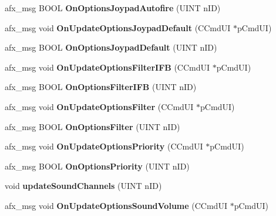 \begin{DoxyCompactItemize}
afx\+\_\+msg B\+O\+OL {\bfseries On\+Options\+Joypad\+Autofire} (U\+I\+NT n\+ID)
\item 
\mbox{\label{class_main_wnd_ae916bc94a817e76c6520085d2eeb0118}} 
afx\+\_\+msg void {\bfseries On\+Update\+Options\+Joypad\+Default} (C\+Cmd\+UI $\ast$p\+Cmd\+UI)
\item 
\mbox{\label{class_main_wnd_a4c5c9c58649b58fb32119749fe2f2d18}} 
afx\+\_\+msg B\+O\+OL {\bfseries On\+Options\+Joypad\+Default} (U\+I\+NT n\+ID)
\item 
\mbox{\label{class_main_wnd_a526505f41dd67ef0c1971aa6825af564}} 
afx\+\_\+msg void {\bfseries On\+Update\+Options\+Filter\+I\+FB} (C\+Cmd\+UI $\ast$p\+Cmd\+UI)
\item 
\mbox{\label{class_main_wnd_ac08824702182bf311a093c5aa39936ef}} 
afx\+\_\+msg B\+O\+OL {\bfseries On\+Options\+Filter\+I\+FB} (U\+I\+NT n\+ID)
\item 
\mbox{\label{class_main_wnd_aa85c55f64e32373f8478ca899aa31ba7}} 
afx\+\_\+msg void {\bfseries On\+Update\+Options\+Filter} (C\+Cmd\+UI $\ast$p\+Cmd\+UI)
\item 
\mbox{\label{class_main_wnd_adfab8994e984c069ace4f06dafcbfbd1}} 
afx\+\_\+msg B\+O\+OL {\bfseries On\+Options\+Filter} (U\+I\+NT n\+ID)
\item 
\mbox{\label{class_main_wnd_ad41b7cfd6de150a00d8fd50b498b0a96}} 
afx\+\_\+msg void {\bfseries On\+Update\+Options\+Priority} (C\+Cmd\+UI $\ast$p\+Cmd\+UI)
\item 
\mbox{\label{class_main_wnd_a98477c70a1ecbeacd3972419972d713e}} 
afx\+\_\+msg B\+O\+OL {\bfseries On\+Options\+Priority} (U\+I\+NT n\+ID)
\item 
\mbox{\label{class_main_wnd_a30b67d9db53d79122684a81e549ebd1c}} 
void {\bfseries update\+Sound\+Channels} (U\+I\+NT n\+ID)
\item 
\mbox{\label{class_main_wnd_a552ffff0119f7cb71c14eb321cec4a4f}} 
afx\+\_\+msg void {\bfseries On\+Update\+Options\+Sound\+Volume} (C\+Cmd\+UI $\ast$p\+Cmd\+UI)

\end{DoxyCompactItemize}
